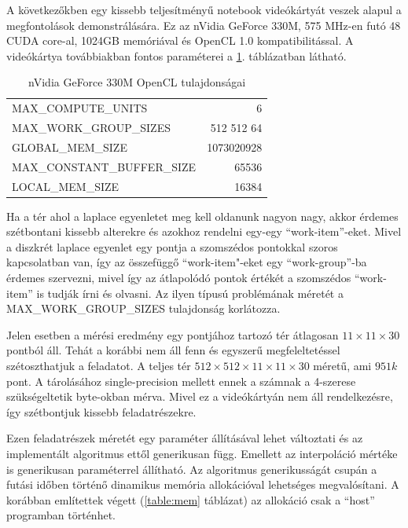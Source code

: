 		A következőkben egy kissebb teljesítményű notebook videókártyát veszek
		alapul a megfontolások demonstrálására. Ez az nVidia GeForce 330M, 
		575 MHz-en futó 48 CUDA core-al, 1024GB memóriával és
		OpenCL 1.0 kompatibilitással.
		A videókártya továbbiakban fontos paraméterei a \ref{table:vcard}. táblázatban
		látható.
		
		\begin{table}[!t]
		\renewcommand{\arraystretch}{1.3}
		\caption{nVidia GeForce 330M OpenCL tulajdonságai}
		\label{table:vcard}
		\centering
		\begin{tabular}{l|r}
			MAX\_COMPUTE\_UNITS & 6\\
			MAX\_WORK\_GROUP\_SIZES & 512 512 64\\
			GLOBAL\_MEM\_SIZE & 1073020928\\
			MAX\_CONSTANT\_BUFFER\_SIZE & 65536\\
			LOCAL\_MEM\_SIZE & 16384
		\end{tabular}
		\end{table}
		
		
		
		Ha a tér ahol a laplace egyenletet meg kell oldanunk nagyon nagy, akkor
		érdemes szétbontani kissebb alterekre és azokhoz rendelni egy-egy
		``work-item''-eket. Mivel a diszkrét laplace egyenlet egy pontja a szomszédos
		pontokkal szoros kapcsolatban van, így az összefüggő ``work-item"-eket egy
		``work-group''-ba érdemes szervezni, mivel így az átlapolódó pontok értékét a
		szomszédos ``work-item'' is tudják írni és olvasni. Az ilyen típusú
		problémának méretét a MAX\_WORK\_GROUP\_SIZES tulajdonság korlátozza.
		
		Jelen esetben a mérési eredmény egy pontjához tartozó tér átlagosan
		$11\times11\times30$ pontból áll.
		Tehát a korábbi nem áll fenn és egyszerű megfeleltetéssel szétoszthatjuk a
		feladatot.
		A teljes tér $512\times512\times11\times11\times30$ méretű, ami $951k$ pont.
		A tárolásához single-precision mellett ennek a számnak a 4-szerese
		szükségeltetik byte-okban mérva. Mivel ez a videókártyán nem áll
		rendelkezésre, így szétbontjuk kissebb feladatrészekre.
		
		Ezen feladatrészek méretét egy paraméter állításával lehet változtati és az
		implementált algoritmus ettől generikusan függ.
		Emellett az interpoláció mértéke is generikusan paraméterrel állítható.
		Az algoritmus generikusságát csupán a futási időben történő dinamikus memória
		allokációval lehetséges megvalósítani. A korábban említettek végett (\ref{table:mem} táblázat)
		az allokáció csak a ``host'' programban történhet.
	
